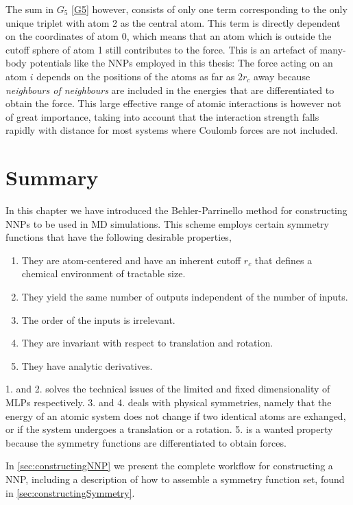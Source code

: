\documentclass[twoside,english]{uiofysmaster}
\begin{document}
The sum in $G_5$ \eqref{G5} however, consists of only one term corresponding to the only unique triplet with atom 2
as the central atom. This term is directly dependent on the coordinates of atom 0, which means that 
an atom which is outside the cutoff sphere of atom 1 still contributes to the force. This is an artefact of many-body potentials
like the NNPs employed in this thesis: The force acting on an atom $i$ depends on the positions of the atoms as 
far as $2r_c$ away because \textit{neighbours of neighbours} are included in the
energies that are differentiated to obtain the force. 
This large effective range of atomic interactions is however not of great importance, taking into account
that the interaction strength falls rapidly with distance for most systems where Coulomb forces are not included. 


\section{Summary}
In this chapter we have introduced the Behler-Parrinello method for constructing NNPs to be used in MD simulations. 
This scheme employs certain symmetry functions that have the following desirable properties,
\begin{enumerate}
 \item They are atom-centered and have an inherent cutoff $r_c$ that defines a chemical environment of tractable size. 
 \item They yield the same number of outputs independent of the number of inputs. 
 \item The order of the inputs is irrelevant. 
 \item They are invariant with respect to translation and rotation.
 \item They have analytic derivatives.
\end{enumerate}
1. and 2. solves the technical issues of the limited and fixed dimensionality of MLPs respectively.
3. and 4. deals with physical symmetries, namely that the energy of an atomic system does not change
if two identical atoms are exhanged, or if the system undergoes a translation or a rotation. 
5. is a wanted property because the symmetry functions are differentiated to obtain forces. 

In \autoref{sec:constructingNNP} we present the complete workflow for constructing a NNP, 
including a description of how to assemble a symmetry function set, found in 
\autoref{sec:constructingSymmetry}.
\end{document}
